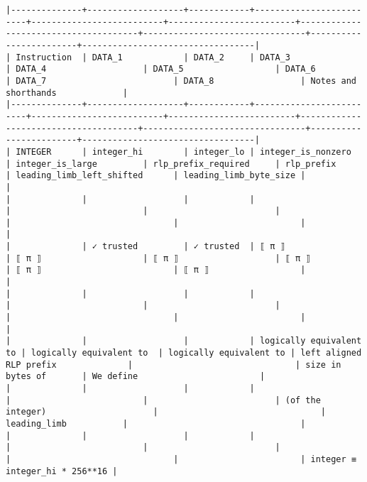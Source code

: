 \documentclass[varwidth=\maxdimen,margin=0.5cm,multi={verbatim}]{standalone}
\begin{document}
\begin{verbatim}
|--------------+-------------------+------------+-------------------------+--------------------------+-------------------------+--------------------------------------+--------------------------------+------------------------+----------------------------------|
| Instruction  | DATA_1            | DATA_2     | DATA_3                  | DATA_4                   | DATA_5                  | DATA_6                               | DATA_7                         | DATA_8                 | Notes and shorthands             |
|--------------+-------------------+------------+-------------------------+--------------------------+-------------------------+--------------------------------------+--------------------------------+------------------------+----------------------------------|
| INTEGER      | integer_hi        | integer_lo | integer_is_nonzero      | integer_is_large         | rlp_prefix_required     | rlp_prefix                           | leading_limb_left_shifted      | leading_limb_byte_size |                                  |
|              |                   |            |                         |                          |                         |                                      |                                |                        |                                  |
|              | ✓ trusted         | ✓ trusted  | ⟦ π ⟧                   | ⟦ π ⟧                    | ⟦ π ⟧                   | ⟦ π ⟧                                | ⟦ π ⟧                          | ⟦ π ⟧                  |                                  |
|              |                   |            |                         |                          |                         |                                      |                                |                        |                                  |
|              |                   |            | logically equivalent to | logically equivalent to  | logically equivalent to | left aligned RLP prefix              |                                | size in bytes of       | We define                        |
|              |                   |            |                         |                          |                         | (of the integer)                     |                                | leading_limb           |                                  |
|              |                   |            |                         |                          |                         |                                      |                                |                        | integer ≡   integer_hi * 256**16 |

\end{verbatim}
\end{document}
